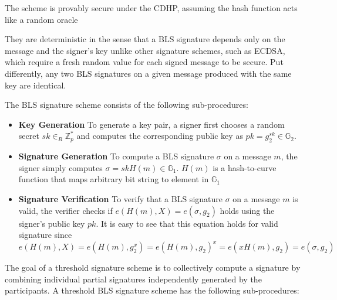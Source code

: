 \documentclass[11pt]{article}
\begin{document}
The scheme is provably secure under the CDHP, assuming the hash function acts like a random oracle

They are deterministic in the sense that a BLS signature depends only on the message and the signer’s key unlike other signature schemes, such as ECDSA, which require a fresh random value for each signed message to be secure. Put differently, any two BLS signatures on a given message produced with the same key are identical. 

The BLS signature scheme consists of the following sub-procedures:
\begin{itemize}
    \item[] \textbf{Key Generation} To generate a key pair, a signer first chooses a random secret $sk \in_R \mathbb{Z}_p^*$ and computes the corresponding public key as $pk = g_2^{sk} \in \mathbb{G}_2$.
    \item[] \textbf{Signature Generation} To compute a BLS signature $\sigma$ on a message $m$, the signer simply computes $\sigma = skH(m) \in \mathbb{G}_1$. $H(m)$ is a hash-to-curve function that maps arbitrary bit string to element in $\mathbb{G}_1$
    \item[] \textbf{Signature Verification} To verify that a BLS signature $\sigma$ on a message $m$ is valid, the verifier checks if $e(H(m),X)=e(\sigma,g_2)$ holds using the signer's public key $pk$. It is easy to see that this equation holds for valid signature since
    \begin{equation}
        e(H(m),X)=e(H(m),g_2^x)=e(H(m),g_2)^x=e(xH(m),g_2)=e(\sigma,g_2)
    \end{equation}
\end{itemize}

The goal of a threshold signature scheme is to collectively compute a signature by combining individual partial signatures independently generated by the participants. A threshold BLS signature scheme has the following sub-procedures:
\end{document}
